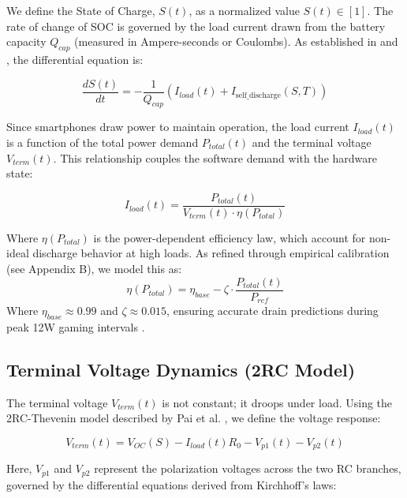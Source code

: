 \documentclass[12pt]{article}
\begin{document}
We define the State of Charge, $S(t)$, as a normalized value $S(t) \in [1]$. The rate of change of SOC is governed by the load current drawn from the battery capacity $Q_{cap}$ (measured in Ampere-seconds or Coulombs). As established in \cite{6} and \cite{9}, the differential equation is:

\begin{equation} \label{eq:soc_ode}
\frac{dS(t)}{dt} = - \frac{1}{Q_{cap}} \left( I_{load}(t) + I_{\text{self\_discharge}}(S, T) \right)
\end{equation}

Since smartphones draw power to maintain operation, the load current $I_{load}(t)$ is a function of the total power demand $P_{total}(t)$ and the terminal voltage $V_{term}(t)$. This relationship couples the software demand with the hardware state:

\begin{equation} \label{eq:current_load}
I_{load}(t) = \frac{P_{total}(t)}{V_{term}(t) \cdot \eta(P_{total})}
\end{equation}

Where $\eta(P_{total})$ is the power-dependent efficiency law, which account for non-ideal discharge behavior at high loads. As refined through empirical calibration (see Appendix B), we model this as:
\begin{equation} \label{eq:efficiency_refined}
\eta(P_{total}) = \eta_{base} - \zeta \cdot \frac{P_{total}(t)}{P_{ref}}
\end{equation}
Where $\eta_{base} \approx 0.99$ and $\zeta \approx 0.015$, ensuring accurate drain predictions during peak 12W gaming intervals \cite{14}.

\subsection{Terminal Voltage Dynamics (2RC Model)}

The terminal voltage $V_{term}(t)$ is not constant; it droops under load. Using the 2RC-Thevenin model described by Pai et al. \cite{6}, we define the voltage response:

\begin{equation} \label{eq:voltage_term}
V_{term}(t) = V_{OC}(S) - I_{load}(t)R_0 - V_{p1}(t) - V_{p2}(t)
\end{equation}

Here, $V_{p1}$ and $V_{p2}$ represent the polarization voltages across the two RC branches, governed by the differential equations derived from Kirchhoff's laws:
\end{document}
